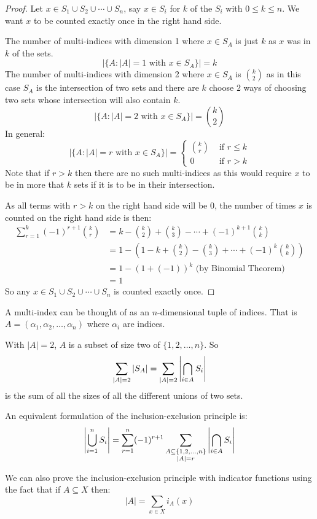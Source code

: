 \documentclass[../main.tex]{subfiles}
\begin{document}
\begin{proof}
  Let $x \in S_1 \cup S_2 \cup \cdots \cup S_n$, say $x \in S_i$ for $k$ of the $S_i$ with $0 \leq k \leq n$.
  We want $x$ to be counted exactly once in the right hand side.

  The number of multi-indices with dimension 1 where $x \in S_A$ is just $k$ as $x$ was in $k$ of the sets.
  \[
    |\{A: |A| = 1 \text{ with } x \in S_A\}| = k
  \]
  The number of multi-indices with dimension 2 where $x \in S_A$ is $\binom{k}{2}$ as in this case $S_A$ is the intersection of two sets and there are $k$ choose $2$ ways of choosing two sets whose intersection will also contain $k$.
  \[
    |\{A: |A| = 2 \text{ with } x \in S_A\}| = \binom{k}{2}
  \]
  In general:
  \[
    |\{A: |A| = r \text{ with } x \in S_A\}| =
    \begin{cases}
    \binom{k}{r} & \text{ if } r\leq k \\
    0 & \text{ if } r > k
    \end{cases}
  \]
  Note that if $r > k$ then there are no such multi-indices as this would require $x$ to be in more that $k$ sets if it is to be in their intersection.

  As all terms with $r > k$ on the right hand side will be 0, the number of times $x$ is counted on the right hand side is then:
  \begin{align*}
    \sum_{r=1}^{k} (-1)^{r + 1} \binom{k}{r} &= k - \binom{k}{2} + \binom{k}{3} - \cdots + (-1)^{k + 1} \binom{k}{k} \\
    &= 1 - \left(1 - k + \binom{k}{2} - \binom{k}{3} + \cdots + (-1)^{k}\binom{k}{k}\right) \\
    &= 1 - (1 + (-1))^{k} \text{ (by Binomial Theorem)}\\
    &= 1
  \end{align*}
  So any $x \in S_1 \cup S_2 \cup \cdots \cup S_n$ is counted exactly once.
\end{proof}
\begin{remark}
  A multi-index can be thought of as an $n$-dimensional tuple of indices.
  That is $A = (\alpha_1, \alpha_2, \ldots, \alpha_n)$ where $\alpha_i$ are indices.
\end{remark}
\begin{example}
  With $|A| = 2$, $A$ is a subset of size two of $\{1, 2, \ldots, n\}$. So
  \[
    \sum_{|A| = 2} |S_A| = \sum_{|A| = 2} \left\lvert \bigcap_{i \in A} S_i  \right\rvert
  \]
  is the sum of all the sizes of all the different unions of two sets.
\end{example}
An equivalent formulation of the inclusion-exclusion principle is:
\[
  \left\lvert \bigcup_{i=1}^{n} S_i \right\rvert = \sum_{r=1}^{n} (-1)^{r+1} \sum_{\substack{A \subseteq \{1, 2, \ldots, n\}\\ |A| = r}} \left\lvert \bigcap_{i \in A}^{} S_i \right\rvert
\]
\begin{remark}
  We can also prove the inclusion-exclusion principle with indicator functions using the fact that if $A \subseteq X$ then:
  \[
    |A| = \sum_{x \in X} i_A(x)
  \]
\end{remark}
\end{document}

